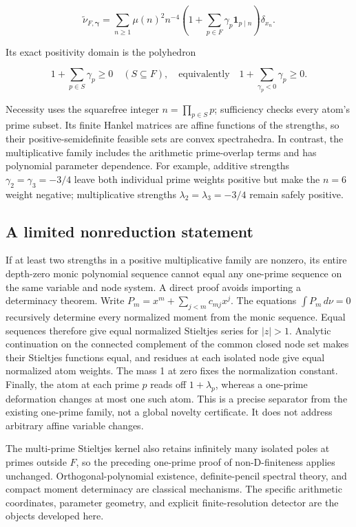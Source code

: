 \[
\widetilde\nu_{F,\boldsymbol\gamma}
=\sum_{n\ge1}\mu(n)^2n^{-4}
\left(1+\sum_{p\in F}\gamma_p\mathbf1_{p\mid n}\right)\delta_{x_n}.
\]

Its exact positivity domain is the polyhedron

\[
1+\sum_{p\in S}\gamma_p\ge0\quad(S\subseteq F),
\quad\text{equivalently}\quad
1+\sum_{\gamma_p<0}\gamma_p\ge0.
\]

Necessity uses the squarefree integer \(n=\prod_{p\in S}p\); sufficiency
checks every atom's prime subset. Its finite Hankel matrices are affine
functions of the strengths, so their positive-semidefinite feasible sets
are convex spectrahedra. In contrast, the multiplicative family includes
the arithmetic prime-overlap terms and has polynomial parameter
dependence. For example, additive strengths \(\gamma_2=\gamma_3=-3/4\)
leave both individual prime weights positive but make the \(n=6\) weight
negative; multiplicative strengths \(\lambda_2=\lambda_3=-3/4\) remain
safely positive.

\hypertarget{a-limited-nonreduction-statement}{%
\subsection{A limited nonreduction
statement}\label{a-limited-nonreduction-statement}}

If at least two strengths in a positive multiplicative family are
nonzero, its entire depth-zero monic polynomial sequence cannot equal
any one-prime sequence on the same variable and node system. A direct
proof avoids importing a determinacy theorem. Write
\(P_m=x^m+\sum_{j<m}c_{mj}x^j\). The equations \(\int P_m\,d\nu=0\)
recursively determine every normalized moment from the monic sequence.
Equal sequences therefore give equal normalized Stieltjes series for
\(|z|>1\). Analytic continuation on the connected complement of the
common closed node set makes their Stieltjes functions equal, and
residues at each isolated node give equal normalized atom weights. The
mass 1 at zero fixes the normalization constant. Finally, the atom at
each prime \(p\) reads off \(1+\lambda_p\), whereas a one-prime
deformation changes at most one such atom. This is a precise separator
from the existing one-prime family, not a global novelty certificate. It
does not address arbitrary affine variable changes.

The multi-prime Stieltjes kernel also retains infinitely many isolated
poles at primes outside \(F\), so the preceding one-prime proof of
non-D-finiteness applies unchanged. Orthogonal-polynomial existence,
definite-pencil spectral theory, and compact moment determinacy are
classical mechanisms. The specific arithmetic coordinates, parameter
geometry, and explicit finite-resolution detector are the objects
developed here.

